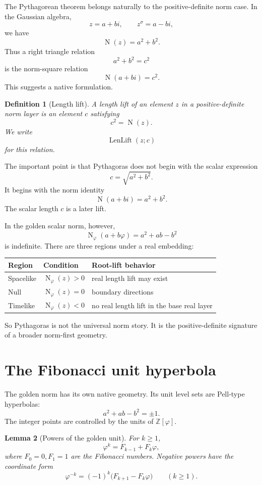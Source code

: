 \documentclass[11pt]{article}
\newtheorem{definition}{Definition}[section]
\newtheorem{lemma}[definition]{Lemma}
\newcommand{\Nm}{\operatorname{N}}
\newcommand{\LenLift}{\operatorname{LenLift}}
\newcommand{\sig}{\sigma}
\newcommand{\ph}{\varphi}
\newcommand{\Z}{\mathbb{Z}}
\begin{document}
The Pythagorean theorem belongs naturally to the positive-definite norm case.  In the Gaussian algebra,
\[
    z=a+bi,
    \qquad
    z^\sig=a-bi,
\]
we have
\[
    \Nm(z)=a^2+b^2.
\]
Thus a right triangle relation
\[
    a^2+b^2=c^2
\]
is the norm-square relation
\[
    \Nm(a+bi)=c^2.
\]
This suggests a native formulation.

\begin{definition}[Length lift]
A length lift of an element $z$ in a positive-definite norm layer is an element $c$ satisfying
\[
    c^2=\Nm(z).
\]
We write
\[
    \LenLift(z;c)
\]
for this relation.
\end{definition}

The important point is that Pythagoras does not begin with the scalar expression
\[
    c=\sqrt{a^2+b^2}.
\]
It begins with the norm identity
\[
    \Nm(a+bi)=a^2+b^2.
\]
The scalar length $c$ is a later lift.

In the golden scalar norm, however,
\[
    \Nm_\ph(a+b\ph)=a^2+ab-b^2
\]
is indefinite.  There are three regions under a real embedding:

\begin{center}
\begin{tabular}{lll}
\toprule
Region & Condition & Root-lift behavior \\
\midrule
Spacelike & $\Nm_\ph(z)>0$ & real length lift may exist \\
Null & $\Nm_\ph(z)=0$ & boundary directions \\
Timelike & $\Nm_\ph(z)<0$ & no real length lift in the base real layer \\
\bottomrule
\end{tabular}
\end{center}

So Pythagoras is not the universal norm story.  It is the positive-definite signature of a broader norm-first geometry.

\section{The Fibonacci unit hyperbola}

The golden norm has its own native geometry.  Its unit level sets are Pell-type hyperbolas:
\[
    a^2+ab-b^2=\pm1.
\]
The integer points are controlled by the units of $\Z[\ph]$.

\begin{lemma}[Powers of the golden unit]\label{lem:phi-powers-fib}
For $k\ge1$,
\[
    \ph^k=F_{k-1}+F_k\ph,
\]
where $F_0=0,F_1=1$ are the Fibonacci numbers.  Negative powers have the coordinate form
\[
    \ph^{-k}=(-1)^k\bigl(F_{k+1}-F_k\ph\bigr)
    \qquad (k\ge1).
\]
\end{lemma}
\end{document}
